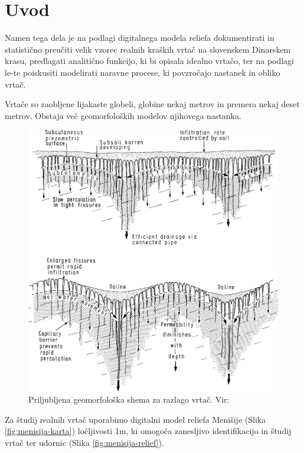 \documentclass[a4paper, oneside, 12pt]{book}
\begin{document}
  \mainmatter
  \setcounter{page}{1}
  \pagestyle{fancy}

  \chapter{Uvod}
  \label{ch1}
  Namen tega dela je na podlagi digitalnega modela reliefa dokumentirati in statistično preučiti velik vzorec realnih kraških vrtač na slovenskem Dinarskem krasu, predlagati analitično funkcijo, ki bi opisala idealno vrtačo, ter na podlagi le-te poiskusiti modelirati naravne procese, ki povzročajo nastanek in obliko vrtač.

  Vrtače so zaobljene lijakaste globeli, globine nekaj metrov in premera nekaj deset metrov. Obstaja več geomorfoloških modelov njihovega nastanka.

  \begin{figure}[H]
    \begin{center}
      \includegraphics[width=13cm]{slike/vrtaca-ford-williams}
    \end{center}
    \caption{Priljubljena geomorfološka shema za razlago vrtač. Vir: \cite{ford2007karst}}
    \label{fig:vrtaca-ford-williams}
  \end{figure}

  Za študij realnih vrtač uporabimo digitalni model reliefa Menišije (Slika \ref{fig:menisija-karta}) ločljivosti 1m, ki omogoča zanesljivo identifikacijo in študij vrtač ter udornic (Slika \ref{fig:menisija-relief}).
\end{document}
